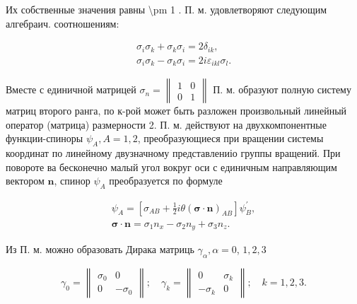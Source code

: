 \documentclass[10pt]{article}
\begin{document}
Их собственные значения равны \textbackslash pm 1 . П. м. удовлетворяют следующим алгебраич. соотношениям:



\[

\begin{gathered}

\sigma_{i} \sigma_{k}+\sigma_{k} \sigma_{i}=2 \delta_{i k}, \\

\sigma_{i} \sigma_{k}-\sigma_{k} \sigma_{i}=2 i \varepsilon_{i k l} \sigma_{l} .

\end{gathered}

\]



Вместе с единичной матрицей $\sigma_{n}=\left\|\begin{array}{ll}1 & 0 \\ 0 & 1\end{array}\right\|$ П. м. образуют полную систему матриц второго ранга, по к-рой может быть разложен произвольный линейный оператор (матрица) размерности 2. П. м. действуют на двухкомпонентные функции-спиноры $\psi_{A}, A=1,2$, преобразующиеся при вращении системы координат по линейному двузначному представлениіо группы вращений. При повороте ва бесконечно малый угол вокруг оси с единичным направляющим вектором $\boldsymbol{n}$, спинор $\psi_{A}$ преобразуется по формуле



\[

\begin{gathered}

\psi_{A}=\left[\sigma_{A B}+\frac{1}{2} i \theta(\boldsymbol{\sigma} \cdot \boldsymbol{n})_{A B}\right] \psi_{B}^{\prime}, \\

\boldsymbol{\sigma} \cdot \boldsymbol{n}=\sigma_{1} n_{x}-\sigma_{2} n_{y}+\sigma_{3} n_{z} .

\end{gathered}

\]



Из П. м. можно образовать Дирака матриць $\gamma_{\alpha}, \alpha=0$, $1,2,3$



\[

\gamma_{0}=\left\|\begin{array}{ll}

\sigma_{0} & 0 \\

0 & -\sigma_{0}

\end{array}\right\| ; \quad \gamma_{k}=\left\|\begin{array}{cc}

0 & \sigma_{k} \\

-\sigma_{k} & 0

\end{array}\right\| ; \quad k=1,2,3 .

\]
\end{document}
